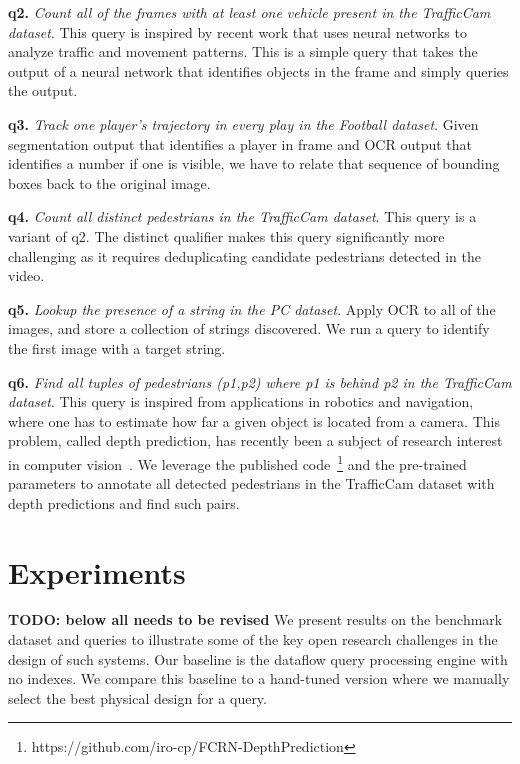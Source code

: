 \vspace{0.25em} \noindent \textbf{q2.} \emph{Count all of the frames with at least one vehicle present in the TrafficCam dataset}. This query is inspired by recent work that uses neural networks to analyze traffic and movement patterns. This is a simple query that takes the output of a neural network that identifies objects in the frame and simply queries the output.

\vspace{0.25em} \noindent \textbf{q3.} \emph{Track one player's trajectory in every play in the Football dataset}. Given segmentation output that identifies a player in frame and OCR output that identifies a number if one is visible, we have to relate that sequence of bounding boxes back to the original image.

\vspace{0.25em} \noindent \textbf{q4.} \emph{Count all distinct pedestrians in the TrafficCam dataset}. This query is a variant of q2. The distinct qualifier makes this query significantly more challenging as it requires deduplicating candidate pedestrians detected in the video.

\vspace{0.25em} \noindent \textbf{q5.} \emph{Lookup the presence of a string in the PC dataset}. Apply OCR to all of the images, and store a collection of strings discovered. We run a query to identify the first image with a target string.

\vspace{0.25em} \noindent \textbf{q6.} \emph{Find all tuples of pedestrians (p1,p2) where p1 is behind p2 in the TrafficCam dataset}. This query is inspired from applications in robotics and navigation, where one has to estimate how far a given object is located from a camera. This problem, called depth prediction, has recently been a subject of research interest in computer vision~\cite{depthPredictModel}. We leverage the published code~\footnote{https://github.com/iro-cp/FCRN-DepthPrediction} and the pre-trained parameters to annotate all detected pedestrians in the TrafficCam dataset with depth predictions and find such pairs.

\section{Experiments}
\textbf{TODO: below all needs to be revised}
We present results on the benchmark dataset and queries to illustrate some of the key open research challenges in the design of such systems.
Our baseline is the dataflow query processing engine with no indexes.
We compare this baseline to a hand-tuned version where we manually select the best physical design for a query.

